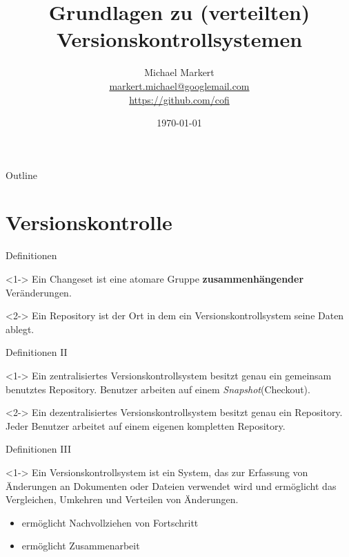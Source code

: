 \documentclass[presentation]{beamer}
\title{Grundlagen zu (verteilten) Versionskontrollsystemen}
\author[Michael Markert]{Michael Markert\\
  \href{mailto:markert.michael@googlemail.com}{markert.michael@googlemail.com}\\
  \url{https://github.com/cofi}}
\date{\today}
\begin{document}
\begin{frame}[plain]
  \titlepage
\end{frame}

\begin{frame}{Outline}
  \setcounter{tocdepth}{1}
  \tableofcontents
\end{frame}
\section{Versionskontrolle}
\begin{frame}{Definitionen}
  \begin{definition}<1->
    Ein \alert{Changeset} ist eine atomare Gruppe \textbf{zusammenhängender}
    Veränderungen.
  \end{definition}
  \begin{definition}<2->
    Ein \alert{Repository} ist der Ort in dem ein Versionskontrollsystem seine
    Daten ablegt.
  \end{definition}
\end{frame}
\begin{frame}{Definitionen II}
  \begin{definition}<1->
    Ein \alert{zentralisiertes Versionskontrollsystem} besitzt genau ein
    gemeinsam benutztes Repository. Benutzer arbeiten auf einem
    \emph{Snapshot}(Checkout).
  \end{definition}
  \begin{definition}<2->
    Ein \alert{dezentralisiertes Versionskontrollsystem} besitzt genau ein
    Repository. Jeder Benutzer arbeitet auf einem eigenen kompletten Repository.
  \end{definition}
\end{frame}
\begin{frame}{Definitionen III}
  \begin{definition}<1->
    Ein \alert{Versionskontrollsystem} ist ein System, das zur Erfassung von
    Änderungen an Dokumenten oder Dateien verwendet wird und ermöglicht das
    Vergleichen, Umkehren und Verteilen von Änderungen.
  \end{definition}
  \begin{itemize}
  \item<2-> ermöglicht Nachvollziehen von Fortschritt
  \item<3-> ermöglicht Zusammenarbeit
  \end{itemize}
\end{frame}
\end{document}
